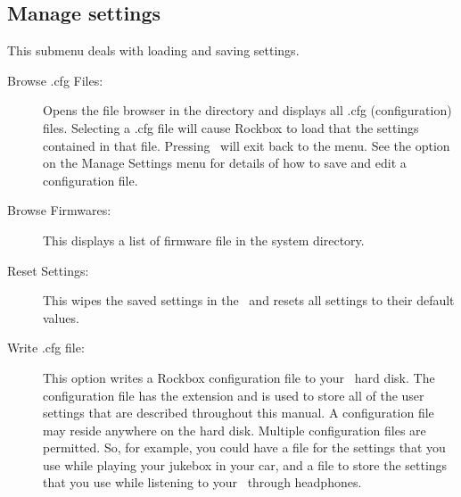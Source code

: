\subsection{\label{sec:manage_settings}Manage settings}
This submenu deals with loading and saving settings. 
%
  \begin{description}
    \item [Browse .cfg Files: ]Opens the file browser in the 
     directory and displays all .cfg (configuration) files.
    Selecting a .cfg file will cause Rockbox to load that the settings
    contained in that file. Pressing \ButtonLeft\ will exit back to the menu. 
    See the  option on the Manage Settings menu for
    details of how to save and edit a configuration file.
    \item [Browse Firmwares: ]This displays a list of firmware file in
    the  system directory. %
    \item [Reset Settings: ]This wipes the saved settings in the \dap\ and
    resets all settings to their default values. 
    \item [Write .cfg file: ]This option writes a Rockbox configuration file
    to your \daps\ hard disk. The configuration file has the 
    extension and is used to store all of the user settings that are described
    throughout this manual.
    A configuration file may reside anywhere on the hard disk. Multiple
    configuration files are permitted. So, for example, you could have 
    a  file for the settings that you use while playing your
    jukebox in your car, and a  file to store the 
    settings that you use while listening to your \dap\ through headphones.


\end{description}
